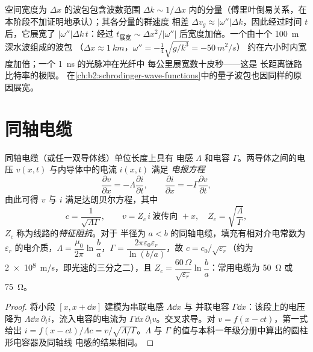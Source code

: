 \begin{remark}[展宽]\label{rem:b2:dispersion-wave-packets:spreading}
空间宽度为 $\Delta x$ 的波包包含波数范围 $\Delta k \sim
1/\Delta x$ 内的分量（傅里叶倒易关系，在本阶段不加证明地承认）；其各分量的群速度
相差 $\Delta v_g \approx |\omega''|\Delta k$，因此经过时间 $t$ 后，它展宽了
$|\omega''|\Delta k\,t$：经过 $t_{\text{展宽}}
\sim \Delta x^2/|\omega''|$ 后宽度加倍。一个由十个 \qty{100}{m} 深水波组成的波包
（$\Delta x \approx \qty{1}{km}$，$\omega'' = -\tfrac14\sqrt{g/k^3} = \qty{-50}{m^2/s}$）
约在六小时内宽度加倍；一个 \qty{1}{ns} 的光脉冲在光纤中
每公里展宽数十皮秒——这是
长距离链路比特率的极限。
在\cref{ch:b2:schrodinger-wave-functions}中的量子波包也因同样的原因展宽。
\end{remark}

\section{同轴电缆}

\begin{proposition}\label{prop:b2:dispersion-wave-packets:coax}
同轴电缆（或任一双导体线）单位长度上具有
电感 $\Lambda$ 和电容 $\Gamma$。两导体之间的电压 $v(x, t)$
与内导体中的电流 $i(x, t)$ 满足
\emph{电报方程}
\[
\frac{\partial v}{\partial x} = -\Lambda\frac{\partial i}{\partial t} , \qquad
\frac{\partial i}{\partial x} = -\Gamma\frac{\partial v}{\partial t} ,
\]
由此可得 $v$ 与 $i$ 满足达朗贝尔方程，其中
\[
c = \frac1{\sqrt{\Lambda\Gamma}} , \qquad
v = Z_c\,i \ \text{波传向 } +x, \quad Z_c = \sqrt{\frac\Lambda\Gamma} ,
\]
$Z_c$ 称为线路的\emph{特征阻抗}。对于
半径为 $a < b$ 的同轴电缆，填充有相对介电常数为
$\varepsilon_r$ 的电介质，$\Lambda = \dfrac{\mu_0}{2\pi}\ln\dfrac ba$，$\Gamma =
\dfrac{2\pi\varepsilon_0\varepsilon_r}{\ln(b/a)}$，故 $c = c_0/\sqrt{\varepsilon_r}$（约为
\qty{2e8}{m/s}，即光速的三分之二），且 $Z_c = \dfrac{60\,\Omega}
{\sqrt{\varepsilon_r}}\ln\dfrac ba$：常用电缆为 \qty{50}{\ohm} 或 \qty{75}{\ohm}。
\end{proposition}

\begin{proof}
将小段 $[x, x + \dd x]$ 建模为串联电感 $\Lambda\dd x$ 与
并联电容 $\Gamma\dd x$：该段上的电压降为
$\Lambda\dd x\,\partial_ti$，流入电容的电流为 $\Gamma\dd x
\,\partial_tv$。交叉求导。对 $v = f(x - ct)$，第一式
给出 $i = f(x - ct)/\Lambda c = v/\sqrt{\Lambda/\Gamma}$。$\Lambda$ 与
$\Gamma$ 的值与本科一年级分册中算出的圆柱形电容器及同轴线
电感的结果相同。
\end{proof}

